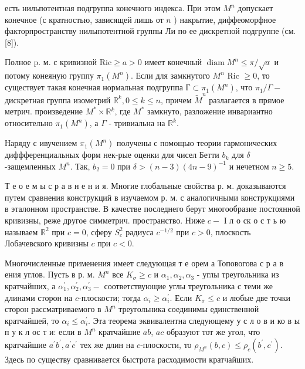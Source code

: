 \documentclass[10pt]{article}
\begin{document}
есть нильпотентная подгруппа конечного индекса. При этом $M^{n}$ допускает конечное (с кратностью, зависящей лишь от $n$ ) накрытие, диффеоморфное факторпространству нилыпотентной группы Ли по ее дискретной подгруппе (см. [8]).



Полное p. м. с кривизной $\mathrm{Ric} \geqslant a>0$ имеет конечный $\operatorname{diam} M^{n} \leqslant \pi / \sqrt{a}$ и потому конеяную группу $\pi_{1}\left(M^{n}\right)$. Если для замкнутого $M^{n}$ Ric $\geqslant 0$, то существует такая конечная нормальная подгруппа $Г \subset \pi_{1}\left(M^{n}\right)$, что $\pi_{1} / \Gamma-$ дискретная группа изометрий $\mathbb{R}^{k}, 0 \leqslant k \leqslant n$, причем $\tilde{M}^{n}$ разлагается в прямое метрич. произведение $M^{*} \times \mathbb{R}{ }^{k}$, где $M^{*}$ замкнуто, разложение инвариантно относительно $\pi_{1}\left(M^{n}\right)$, а $\Gamma$ - тривиальна на $\mathbb{R}^{k}$.



Наряду с ивучением $\pi_{1}\left(M^{n}\right)$ получены с помощью теории гармонических диффференциальных форм нек-рые оценки для чисел Бетти $b_{k}$ для $\delta$-защемленных $M^{n}$. Так, $b_{2}=0$ при $\delta>(n-3)(4 n-9)^{-1}$ и нечетном $n \geqslant 5$.



Т е о е м ы с р а в н е н и я. Многие глобальные свойства р. м. доказываются путем сравнения конструкций в изучаемом р. м. с аналогичными конструкциями в эталонном пространстве. В качестве последнего берут многообразие постоянной кривизны, реже другое симметрич. пространство. Ниже $c-$ I л о ск о с т ь ю называем $\mathbb{R}^{2}$ при $c=0$, сферу $S_{c}^{2}$ радиуса $c^{-1 / 2}$ при $c>0$, плоскость Лобачевского кривизны $c$ при $c<0$.



Многочисленные применения имеет следующая т е орем а Топовогова с р а в ения углов. Пусть в р. м. $M^{n}$ все $K_{\sigma} \geqslant c$ и $\alpha_{1}, \alpha_{2}, \alpha_{3}$ - углы треугольника из кратчайших, а $\alpha_{1}^{\prime}, \alpha_{2}^{\prime}, \alpha_{3}^{\prime}-$ соответствующие углы треугольника с теми же длинами сторон на $c$-плоскости; тогда $\alpha_{i} \geqslant \alpha_{i}^{\prime}$. Если $K_{\sigma} \leqslant c$ и любые две точки сторон рассматриваемого в $M^{n}$ треугольника соединимы единственной кратчайшей, то $\alpha_{i} \leqslant \alpha_{i}^{\prime}$. Эта теорема эквивалентна следующему у с л о в и ко в ы п у к л ос т и: если в $M^{n}$ кратчайшие $a b$, $a c$ образуют тот же угол, что кратчайшие $a^{\prime} b^{\prime}, a^{\prime} c^{\prime}$ тех же длин на $c$-плоскости, то $\rho_{M^{n}}(b, c) \leqslant \rho_{c}\left(b^{\prime}, c^{\prime}\right)$. Здесь по существу сравнивается быстрота расходимости кратчайших.
\end{document}

